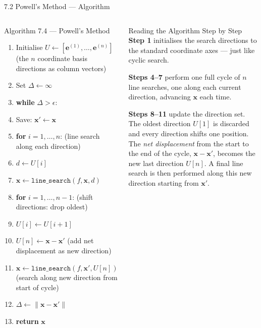 \documentclass[aspectratio=169,10pt]{beamer}
\begin{document}
\begin{frame}[allowframebreaks]{7.2 Powell's Method --- Algorithm}
\begin{columns}[T]
\begin{alertblock}{Algorithm 7.4 --- Powell's Method}
        \begin{enumerate}\setlength\itemsep{1pt}
          \item Initialise $U \leftarrow [\mathbf{e}^{(1)},\ldots,\mathbf{e}^{(n)}]$
                (the $n$ coordinate basis directions as column vectors)
          \item Set $\Delta \leftarrow \infty$
          \item \textbf{while} $\Delta > \epsilon$:
          \item \quad Save: $\mathbf{x}' \leftarrow \mathbf{x}$
          \item \quad \textbf{for} $i = 1,\ldots,n$: \hfill
                (line search along each direction)
          \item \qquad $d \leftarrow U[i]$
          \item \qquad $\mathbf{x} \leftarrow \texttt{line\_search}(f,\mathbf{x},d)$
          \item \quad \textbf{for} $i = 1,\ldots,n-1$: \hfill
                (shift directions: drop oldest)
          \item \qquad $U[i] \leftarrow U[i+1]$
          \item \quad $U[n] \leftarrow \mathbf{x} - \mathbf{x}'$
                \hfill (add net displacement as new direction)
          \item \quad $\mathbf{x} \leftarrow
                \texttt{line\_search}(f,\mathbf{x}',U[n])$
                \hfill (search along new direction from start of cycle)
          \item \quad $\Delta \leftarrow \|\mathbf{x} - \mathbf{x}'\|$
          \item \textbf{return} $\mathbf{x}$
        \end{enumerate}
      \end{alertblock}
      \begin{block}{Reading the Algorithm Step by Step}
        \textbf{Step 1} initialises the search directions to the
        standard coordinate axes --- just like cyclic search.

        \textbf{Steps 4--7} perform one full cycle of $n$ line searches,
        one along each current direction, advancing $\mathbf{x}$ each
        time.

        \textbf{Steps 8--11} update the direction set.  The oldest
        direction $U[1]$ is discarded and every direction shifts one
        position.  The \emph{net displacement} from the start to the
        end of the cycle, $\mathbf{x} - \mathbf{x}'$, becomes the new
        last direction $U[n]$.  A final line search is then performed
        along this new direction starting from $\mathbf{x}'$.


\end{block}
\end{columns}
\end{frame}
\end{document}
